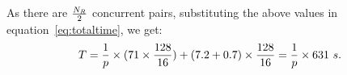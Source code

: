 \documentclass{rspublic}
\newcommand{\alnote}[1]{ {\textcolor{blue} { ***andre: #1 }}}
\newcommand{\athotanote}[1]{ {\textcolor{green} { ***athota: #1 }}}
\newcommand{\alnote}[1]{}
\newcommand{\athotanote}[1]{}
\begin{document}






As there are $N_R \over 2$ concurrent pairs, substituting the above
values in equation~\ref{eq:totaltime}, we get:
\begin{eqnarray}
T=  {1 \over p} \times {{(71\times {128\over 16}}) + {(7.2+0.7)\times {128\over 16}}} = {1 \over p} \times 631~s.
\label{eq:decent}
\end{eqnarray}

\end{document}
